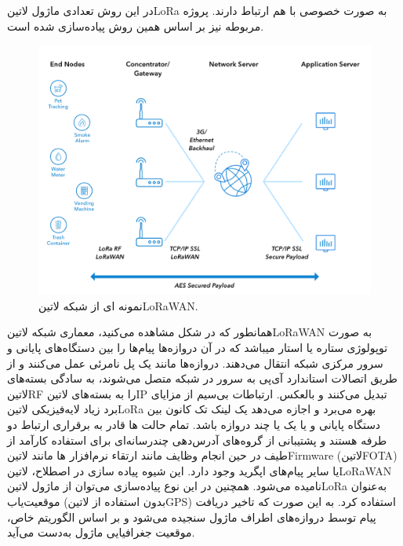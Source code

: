 
در این روش تعدادی ماژول ‌لاتین{LoRa} به صورت خصوصی با هم ارتباط دارند. پروژه مربوطه نیز بر اساس همین روش پیاده‌سازی شده است.


\begin{figure}[!h]
	\centering
	\includegraphics[width=\linewidth]{Assets/lorawan.png}
	\caption{ نمونه ای از شبکه ‌لاتین{LoRaWAN}.}
	\label{fig:LoRaWAN}
\end{figure}

همانطور که در شکل  مشاهده می‌کنید، معماری شبکه ‌لاتین{LoRaWAN} به صورت توپولوژی ستاره یا استار میباشد که در آن دروازه‌ها پیام‌ها را بین دستگاه‌های پایانی و سرور مرکزی شبکه انتقال می‌دهند. دروازه‌ها مانند یک پل نامرئی عمل می‌کنند و از طریق اتصالات استاندارد آی‌پی به سرور در شبکه متصل می‌شوند، به سادگی بسته‌های ‌لاتین{RF} را به بسته‌های ‌لاتین{IP} تبدیل می‌کنند و بالعکس. ارتباطات بی‌سیم از مزایای برد زیاد لایه‌فیزیکی ‌لاتین{LoRa} بهره می‌برد و اجازه می‌دهد یک لینک تک کانون بین دستگاه پایانی و یا یک یا چند دروازه باشد. تمام حالت ها قادر به برقراری ارتباط دو طرفه هستند و پشتیبانی از گروه‌های آدرس‌دهی چندرسانه‌ای برای استفاده کارآمد از طیف در حین انجام وظایف مانند ارتقاء نرم‌افزار ها مانند ‌لاتین{Firmware} (‌لاتین{FOTA}) یا سایر پیام‌های اپگرید وجود دارد. این شیوه پیاده سازی در اصطلاح، ‌لاتین{LoRaWAN} نامیده می‌شود. همچنین در این نوع پیاده‌سازی می‌توان از ماژول ‌لاتین{LoRa} به‌عنوان موقعیت‌یاب (بدون استفاده از ‌لاتین{GPS}) استفاده کرد. به این صورت که تاخیر دریافت پیام توسط دروازه‌های اطراف ماژول سنجیده می‌شود و بر اساس الگوریتم خاص، موقعیت جغرافیایی ماژول به‌دست می‌آید.

